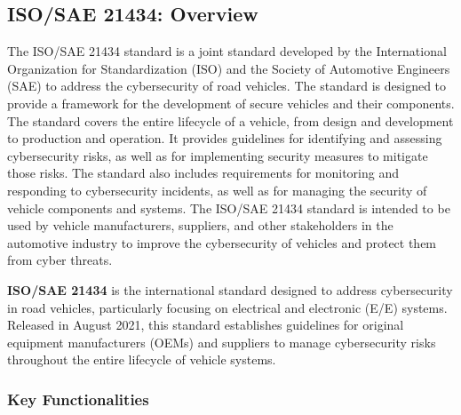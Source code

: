 \subsection{ISO/SAE 21434: Overview}\label{subsec:iso-sae-21434}

The ISO/SAE 21434 standard is a joint standard developed by the International Organization for Standardization (ISO) and the Society of Automotive Engineers (SAE) to address the cybersecurity of road vehicles.
The standard is designed to provide a framework for the development of secure vehicles and their components.
The standard covers the entire lifecycle of a vehicle, from design and development to production and operation.
It provides guidelines for identifying and assessing cybersecurity risks, as well as for implementing security measures to mitigate those risks.
The standard also includes requirements for monitoring and responding to cybersecurity incidents, as well as for managing the security of vehicle components and systems.
The ISO/SAE 21434 standard is intended to be used by vehicle manufacturers, suppliers, and other stakeholders in the automotive industry to improve the cybersecurity of vehicles and protect them from cyber threats.

\textbf{ISO/SAE 21434} is the international standard designed to address cybersecurity in road vehicles, particularly focusing on electrical and electronic (E/E) systems.
Released in August 2021, this standard establishes guidelines for original equipment manufacturers (OEMs) and suppliers to manage cybersecurity risks throughout the entire lifecycle of vehicle systems.

\subsubsection{Key Functionalities}\label{subsubsec:key-functionalities}

